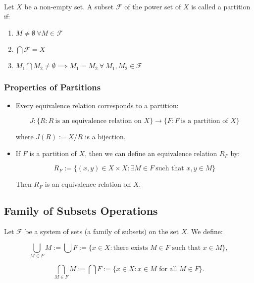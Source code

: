 Let \(X\) be a non-empty set. A subset \(\mathscr{F}\) of the power set of \(X\) is called a 
partition if:

\begin{enumerate}
	
	\item \(M \neq  \emptyset\ \forall M \in \mathscr{F}\)
 
	\item \(\bigcap \mathscr{F} = X\)
 
	\item \(M_1 \bigcap M_2 \ne \emptyset \implies M_1 = M_2\ \forall\ M_1, M_2 \in \mathscr{F} \) 

\end{enumerate}

\subsubsection{Properties of Partitions}

\begin{itemize}

	\item Every equivalence relation corresponds to a partition:

		  \[
		      J: \{ R : R\ \text{is an equivalence relation on } X\} \to \{ F: F\ \text{is a partition of } X\}
	      \]

	      where \( J(R) := X / R \) is a bijection.

	\item If \(F\) is a partition of \(X\), then we can define an equivalence relation \( R_F \) by:
	      
		  \[
		      R_F := \{ (x, y) \in X \times X : \exists M \in F\ \text{such that } x, y \in M \}
	      \]
	      
		  Then \( R_F \) is an equivalence relation on \(X\).

\end{itemize}


\subsection{Family of Subsets Operations}

Let \(\mathscr{F}\) be a system of sets (a family of subsets) on the set \(X\). We define:

\[
	\bigcup_{M \in F} M := \bigcup F := \{ x \in X : \text{there exists } M \in F \text{ such that } x 
	\in M \} ,
\]

\[
	\bigcap_{M \in F} M := \bigcap F := \{ x \in X : x \in M \text{ for all } M \in F \} .
\]